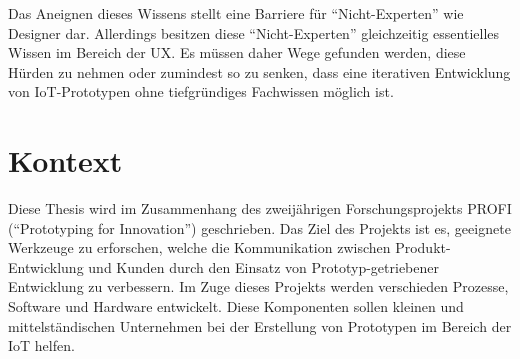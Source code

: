 Das Aneignen dieses Wissens stellt eine Barriere für "`Nicht-Experten"' wie Designer dar. Allerdings besitzen diese "`Nicht-Experten"' gleichzeitig essentielles Wissen im Bereich der \ac{UX}. Es müssen daher Wege gefunden werden, diese Hürden zu nehmen oder zumindest so zu senken, dass eine iterativen Entwicklung von \ac{IoT}-Prototypen ohne tiefgründiges Fachwissen möglich ist. 

\section{Kontext}\label{sec:1_kontext}
Diese Thesis wird im Zusammenhang des zweijährigen Forschungsprojekts PROFI ("`Prototyping for Innovation"') geschrieben. Das Ziel des Projekts ist es, geeignete Werkzeuge zu erforschen, welche die Kommunikation zwischen Produkt-Entwicklung und Kunden durch den Einsatz von Prototyp-getriebener Entwicklung zu verbessern. Im Zuge dieses Projekts werden verschieden Prozesse, Software und Hardware entwickelt. Diese Komponenten sollen kleinen und mittelständischen Unternehmen bei der Erstellung von Prototypen im Bereich der \ac{IoT} helfen.

